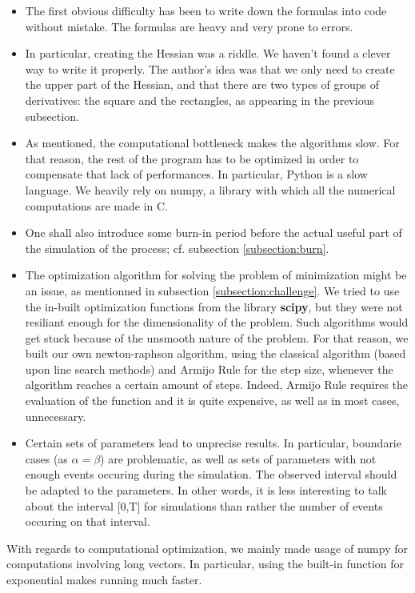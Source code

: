\documentclass[11pt]{book}
\begin{document}
\begin{itemize}
\item The first obvious difficulty has been to write down the formulas into code without mistake. The formulas are heavy and very prone to errors.
\item In particular, creating the Hessian was a riddle. We haven't found a clever way to write it properly. The author's idea was that we only need to create the upper part of the Hessian, and that there are two types of groups of derivatives: the square and the rectangles, as appearing in the previous subsection.
\item As mentioned, the computational bottleneck makes the algorithms slow. For that reason, the rest of the program has to be optimized in order to compensate that lack of performances. In particular, Python is a slow language. We heavily rely on numpy, a library with which all the numerical computations are made in C.
\item One shall also introduce some burn-in period before the actual useful part of the simulation of the process; cf. subsection \ref{subsection:burn}.
\item The optimization algorithm for solving the problem of minimization might be an issue, as mentionned in subsection \ref{subsection:challenge}. We tried to use the in-built optimization functions from the library \textbf{scipy}, but they were not resiliant enough for the dimensionality of the problem. Such algorithms would get stuck because of the unsmooth nature of the problem. For that reason, we built our own newton-raphson algorithm, using the classical algorithm (based upon line search methods) and Armijo Rule for the step size, whenever the algorithm reaches a certain amount of steps. Indeed, Armijo Rule requires the evaluation of the function and it is quite expensive, as well as in most cases, unnecessary.
\item Certain sets of parameters lead to unprecise results. In particular, boundarie cases (as $\alpha = \beta$) are problematic, as well as sets of parameters with not enough events occuring during the simulation. The observed interval should be adapted to the parameters. In other words, it is less interesting to talk about the interval [0,T] for simulations than rather the number of events occuring on that interval.
\end{itemize}

With regards to computational optimization, we mainly made usage of numpy for computations involving long vectors. In particular, using the built-in function for exponential makes running much faster. 
\end{document}
